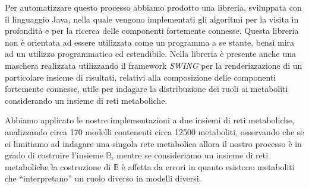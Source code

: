 \documentclass[twoside,openright,titlepage,fleqn,
headinclude,11pt,a4paper,BCOR5mm,footinclude ]{scrbook}
\begin{document}
Per automatizzare questo processo abbiamo prodotto una libreria,
sviluppata con il linguaggio Java, nella quale vengono implementati
gli algoritmi per la visita in profondit\`a e per la ricerca delle
componenti fortemente connesse. Questa libreria non \`e orientata ad
essere utilizzata come un programma a se stante, bens\`i mira ad un
utilizzo programmatico ed estendibile. Nella libreria \`e presente
anche una maschera realizzata utilizzando il framework \emph{SWING}
per la renderizzazione di un particolare insieme di risultati,
relativi alla composizione delle componenti fortemente connesse, utile
per indagare la distribuzione dei ruoli ai metaboliti considerando un
insieme di reti metaboliche.

Abbiamo applicato le nostre implementazioni a due insiemi di reti
metaboliche, analizzando circa 170 modelli contenenti circa 12500
metaboliti, osservando che se ci limitiamo ad indagare una singola
rete metabolica allora il nostro processo \`e in grado di costruire
l'insieme $\mathbb{B}$, mentre se consideriamo un insieme di reti
metaboliche la costruzione di $\mathbb{B}$ \`e affetta da errori in
quanto esistono metaboliti che ``interpretano'' un ruolo diverso in
modelli diversi.
\end{document}
